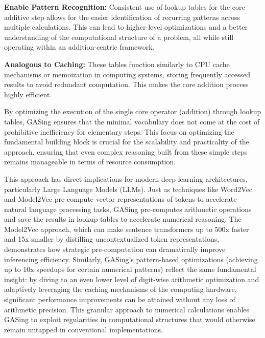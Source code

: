 \noindent\textbf{\textbf{Enable Pattern Recognition}:} Consistent use of lookup tables for the core additive step allows for the easier identification of recurring patterns across multiple calculations. This can lead to higher-level optimizations and a better understanding of the computational structure of a problem, all while still operating within an addition-centric framework.


\noindent\textbf{\textbf{Analogous to Caching}:} These tables function similarly to CPU cache mechanisms or memoization in computing systems, storing frequently accessed results to avoid redundant computation. This makes the core addition process highly efficient.


By optimizing the execution of the single core operator (addition) through lookup tables, GASing ensures that the minimal vocabulary does not come at the cost of prohibitive inefficiency for elementary steps. This focus on optimizing the fundamental building block is crucial for the scalability and practicality of the approach, ensuring that even complex reasoning built from these simple steps remains manageable in terms of resource consumption.

This approach has direct implications for modern deep learning architectures, particularly Large Language Models (LLMs). Just as techniques like Word2Vec and Model2Vec pre-compute vector representations of tokens to accelerate natural language processing tasks, GASing pre-computes arithmetic operations and save the results in lookup tables to accelerate numerical reasoning. The Model2Vec approach, which can make sentence transformers up to 500x faster and 15x smaller by distilling uncontextualized token representations, demonstrates how strategic pre-computation can dramatically improve inferencing efficiency. Similarly, GASing's pattern-based optimizations (achieving up to 10x speedups for certain numerical patterns) reflect the same fundamental insight: by diving to an even lower level of digit-wise arithmetic optimization and adaptively leveraging the caching mechanisms of the computing hardware, significant performance improvements can be attained without any loss of arithmetic precision. This granular approach to numerical calculations enables GASing to exploit regularities in computational structures that would otherwise remain untapped in conventional implementations.

